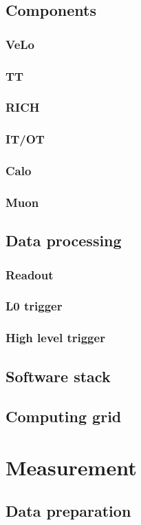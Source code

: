 \section{Components}
\subsection{VeLo}
\subsection{TT}
\subsection{RICH}
\subsection{IT/OT}
\subsection{Calo}
\subsection{Muon}
\section{Data processing}
\subsection{Readout}
\subsection{L0 trigger}
\subsection{High level trigger}
\section{Software stack}
\section{Computing grid}

\chapter{Measurement}
\section{Data preparation}

